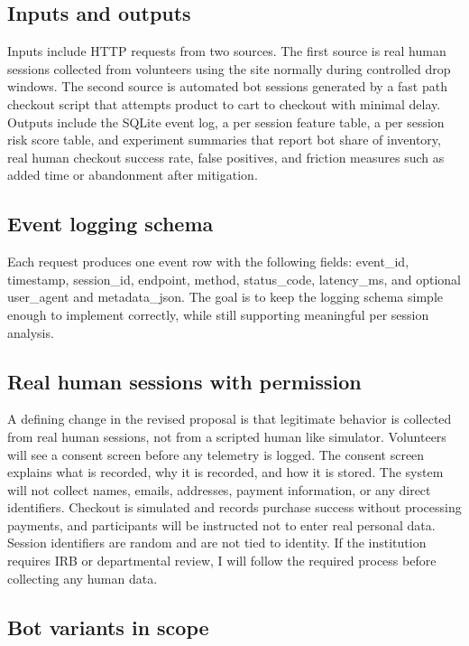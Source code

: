 \documentclass[12pt]{article}
\begin{document}
\subsection*{Inputs and outputs}

Inputs include HTTP requests from two sources. The first source is real human sessions collected from volunteers using the site normally during controlled drop windows. The second source is automated bot sessions generated by a fast path checkout script that attempts product to cart to checkout with minimal delay. Outputs include the SQLite event log, a per session feature table, a per session risk score table, and experiment summaries that report bot share of inventory, real human checkout success rate, false positives, and friction measures such as added time or abandonment after mitigation.

\subsection*{Event logging schema}

Each request produces one event row with the following fields: event\_id, timestamp, session\_id, endpoint, method, status\_code, latency\_ms, and optional user\_agent and metadata\_json. The goal is to keep the logging schema simple enough to implement correctly, while still supporting meaningful per session analysis.

\subsection*{Real human sessions with permission}

A defining change in the revised proposal is that legitimate behavior is collected from real human sessions, not from a scripted human like simulator. Volunteers will see a consent screen before any telemetry is logged. The consent screen explains what is recorded, why it is recorded, and how it is stored. The system will not collect names, emails, addresses, payment information, or any direct identifiers. Checkout is simulated and records purchase success without processing payments, and participants will be instructed not to enter real personal data. Session identifiers are random and are not tied to identity. If the institution requires IRB or departmental review, I will follow the required process before collecting any human data.

\subsection*{Bot variants in scope}
\end{document}
